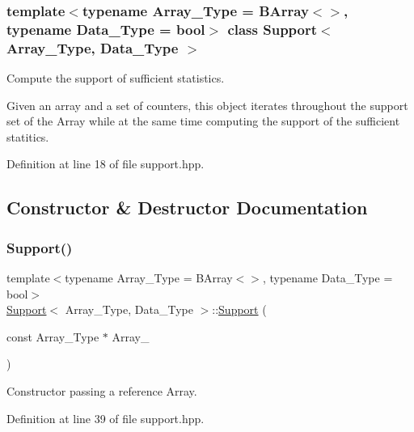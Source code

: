\subsubsection*{template$<$typename Array\+\_\+\+Type = B\+Array$<$$>$, typename Data\+\_\+\+Type = bool$>$\newline
class Support$<$ Array\+\_\+\+Type, Data\+\_\+\+Type $>$}

Compute the support of sufficient statistics. 

Given an array and a set of counters, this object iterates throughout the support set of the Array while at the same time computing the support of the sufficient statitics. 

Definition at line 18 of file support.\+hpp.



\subsection{Constructor \& Destructor Documentation}
\mbox{\label{class_support_a4a0587bc6f1f268005a94fea039ea6ba}} 
\subsubsection{\texorpdfstring{Support()}{Support()}\hspace{0.1cm}{\footnotesize\ttfamily [1/3]}}
{\footnotesize\ttfamily template$<$typename Array\+\_\+\+Type = B\+Array$<$$>$, typename Data\+\_\+\+Type = bool$>$ \\
\hyperlink{class_support}{Support}$<$ Array\+\_\+\+Type, Data\+\_\+\+Type $>$\+::\hyperlink{class_support}{Support} (\begin{DoxyParamCaption}\item[{const Array\+\_\+\+Type $\ast$}]{Array\+\_\+ }\end{DoxyParamCaption})\hspace{0.3cm}{\ttfamily [inline]}}



Constructor passing a reference Array. 



Definition at line 39 of file support.\+hpp.

\mbox{\label{class_support_aff7d2705d6f765fcbd8958453b7dbefe}} 
